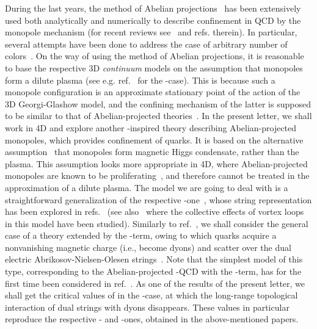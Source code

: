 \documentclass[a4paper,12pt]{article}
\begin{document}
During the last years,
the method of Abelian projections~\cite{th} has been extensively used
both analytically and numerically to describe confinement
in QCD by the monopole mechanism (for recent reviews see~\cite{digiacomo} and refs. therein).
In particular, several attempts have been done to address the case of arbitrary number of colors~\cite{suN, suNN}.
On the way of using the method of Abelian projections, it is reasonable to base the respective 3D {\it continuum} models on the
assumption that monopoles form a dilute plasma (see e.g. ref.~\cite{dw} for the \coordHE{}-case).
This is because such a monopole configuration is an approximate stationary point of the
action of the \coordHE{} 3D Georgi-Glashow model, and the confining mechanism of the latter is supposed to be
similar to that of Abelian-projected theories~\cite{th}.
In the present letter, we shall work in 4D and explore another
\coordHE{}-inspired theory describing Abelian-projected monopoles, which provides confinement of quarks.
It is based on the alternative assumption~\cite{tHM} that monopoles form magnetic
Higgs condensate, rather than the plasma. This assumption looks more appropriate in 4D, where Abelian-projected monopoles are known to be
proliferating~\cite{pb}, and therefore cannot be treated in the approximation of a dilute plasma.
The model we are going to deal with is a straightforward generalization of the respective \coordHE{}-one~\cite{maedan},
whose string representation
has been explored in refs.~\cite{su3, theta} (see also~\cite{moresu3} where the collective effects of vortex loops in this model
have been studied).
Similarly to ref.~\cite{theta}, we shall consider the general case of a
theory extended by the \myHighlight{$\Theta$}\coordHE{}-term, owing to which quarks acquire a nonvanishing magnetic charge (i.e., become dyons)
and scatter over the dual electric Abrikosov-Nielsen-Olesen strings~\cite{ano}. Note that the simplest model
of this type, corresponding to the Abelian-projected \coordHE{}-QCD with the \myHighlight{$\Theta$}\coordHE{}-term, has for the first time
been considered in ref.~\cite{emil}. As one of the results of the present letter, we shall get the
critical values of \myHighlight{$\Theta$}\coordHE{} in the \coordHE{}-case, at which the long-range topological interaction of dual strings
with dyons disappears. These values in particular reproduce the respective \coordHE{}- and \coordHE{}-ones, obtained in the above-mentioned
papers.
\end{document}
